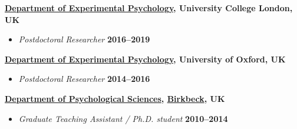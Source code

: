 \documentclass[10pt]{article}
\newenvironment{outerlist}[1][\enskip\textbullet]%
        {\begin{itemize}[#1]}{\end{itemize}%
         \vspace{-.6\baselineskip}}
\newenvironment{innerlist}[1][\enskip\textbullet]%
        {\begin{compactitem}[#1]}{\end{compactitem}}
\begin{document}
  \vspace{15pt}
 
  
\begin{samepage}

\textbf{\href{https://www.ucl.ac.uk/pals/research/experimental-psychology/}{Department of Experimental Psychology}, University College London, UK}
\begin{outerlist}
  \item[\textit{Postdoctoral Researcher}] \hfill \textbf{2016--2019}
  
  \end{outerlist}
  \end{samepage}

  \vspace{15pt}


  \begin{samepage}
  \textbf{\href{http://www.psy.ox.ac.uk/}{Department of Experimental Psychology}, University of Oxford, UK}
  \begin{outerlist}
  \item[\textit{Postdoctoral Researcher}] \hfill \textbf{2014--2016}

\end{outerlist}
  \vspace{15pt}
  \end{samepage}

\textbf{\href{http://www.bbk.ac.uk/psychology/}{Department of Psychological Sciences}, \href{http://www.bbk.ac.uk/}{Birkbeck}, UK}
\begin{outerlist}
  \item[\textit{Graduate Teaching Assistant / Ph.D. student}] \hfill \textbf{2010--2014}

\end{outerlist}
\end{document}
